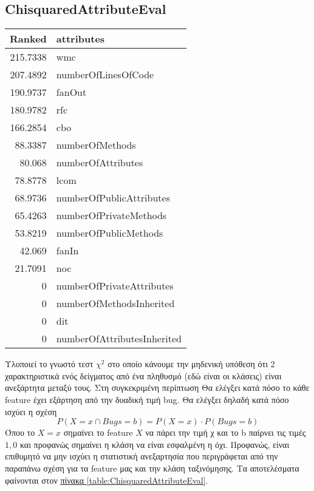 \subsection{ChisquaredAttributeEval}
\begin{center}
\begin{tabular}{r|l}
Ranked& attributes\\
\hline
215.7338 &  wmc\\
207.4892 &   numberOfLinesOfCode\\
190.9737 &   fanOut\\
180.9782 &  rfc\\
166.2854 &   cbo\\
88.3387 &  numberOfMethods\\
80.068  &   numberOfAttributes\\
78.8778&   lcom\\
68.9736&   numberOfPublicAttributes\\
65.4263&   numberOfPrivateMethods\\
53.8219&   numberOfPublicMethods\\
42.069  &   fanIn\\
21.7091&    noc\\
0      &  numberOfPrivateAttributes\\
0     &   numberOfMethodsInherited\\
0    &     dit\\
0    &     numberOfAttributesInherited\\
\end{tabular}
\label{table:ChisquaredAttributeEval}
\end{center}
Υλοποιεί το γνωστό τεστ $\chi^2 $ στο οποίο κάνουμε την μηδενική υπόθεση ότι 2 χαρακτηριστικά ενός δείγματος από ένα πληθυσμό (εδώ είναι οι κλάσεις) είναι ανεξάρτητα μεταξύ τους.
Στη συγκεκριμένη περίπτωση Θα ελέγξει κατά πόσο το κάθε feature έχει εξάρτηση από την δυαδική τιμή bug.
Θα ελέγξει δηλαδή  κατά πόσο ισχύει η σχέση
\[ P(X=x \cap Bugs = b) = P(X=x) \cdot P(Bugs =b) \]
Όπου το $X=x$ σημαίνει το feature $Χ$ να πάρει την τιμή χ και το b  παίρνει τις τιμές $1,0$ και προφανώς σημαίνει η κλάση να είναι εσφαλμένη η όχι.
Προφανώς, είναι επιθυμητό να μην ισχύει η στατιστική ανεξαρτησία που περιγράφεται από την παραπάνω σχέση για τα feature μας και την κλάση ταξινόμησης.
Τα αποτελέσματα φαίνονται στον
\hyperref[table:ChisquaredAttributeEval]{πίνακα \ref{table:ChisquaredAttributeEval}}.

